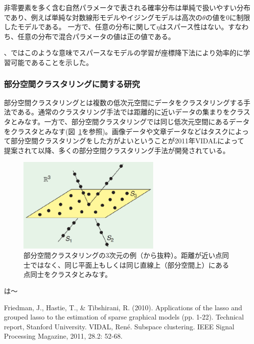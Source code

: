 非零要素を多く含む自然パラメータで表される確率分布は単純で扱いやすい分布であり、例えば単純な対数線形モデルやイジングモデルは高次の$\theta$の値を0に制限したモデルである。
一方で、任意の分布に関して$\eta$はスパース性はない。すなわち、任意の分布で混合パラメータの値は正の値である。


\cite{HSM01}、\cite{HSM02}ではこのような意味でスパースなモデルの学習が座標降下法により効率的に学習可能であることを示した。


\subsubsection{部分空間クラスタリングに関する研究}

部分空間クラスタリングとは複数の低次元空間にデータをクラスタリングする手法である。通常のクラスタリング手法では距離的に近いデータの集まりをクラスタとみなす。一方で、部分空間クラスタリングでは同じ低次元空間にあるデータをクラスタとみなす(図~\ref{fig:my_label}を参照)。画像データや文章データなどはタスクによって部分空間クラスタリングをした方がよいということが2011年VIDAL\cite{SC}によって提案されて以降、多くの部分空間クラスタリング手法が開発されている。

\begin{figure}[h]
    \centering
    \includegraphics[width=7cm]{Matsushima/sc.eps}
    \caption{部分空間クラスタリングの3次元の例（\cite{SC}から抜粋）。距離が近い点同士ではなく、同じ平面上もしくは同じ直線上（部分空間上）にある点同士をクラスタとみなす。}
    \label{fig:my_label}
\end{figure}
\cite{NM01}は〜

\begin{thebibliography}{9}
    Friedman, J., Hastie, T., & Tibshirani, R. (2010). 
    Applications of the lasso and grouped lasso to the estimation of sparse graphical models (pp. 1-22). Technical report, Stanford University.
 VIDAL, René. Subspace clustering. IEEE Signal Processing Magazine, 2011, 28.2: 52-68.
\end{thebibliography}

